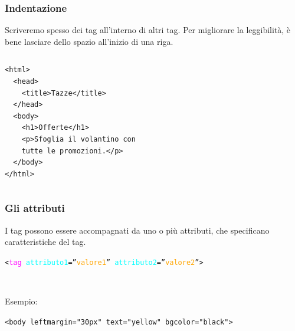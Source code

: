\documentclass[]{beamer}
\begin{document}
\begin{frame}[fragile]
\frametitle{Indentazione}
Scriveremo spesso dei tag all'interno di altri tag. Per migliorare la leggibilità, è bene lasciare dello spazio all'inizio di una riga.
\begin{columns}
\begin{column}{0.5\textwidth}
\begin{scriptsize}
\begin{verbatim}
<html>
  <head>
    <title>Tazze</title>
  </head>
  <body>
    <h1>Offerte</h1>
    <p>Sfoglia il volantino con
    tutte le promozioni.</p>
  </body>
</html>
\end{verbatim}
\end{scriptsize}\pause
\end{column}
\begin{column}{0.3\textwidth}
\begin{figure}
\end{figure}
\end{column}
\end{columns}  
\end{frame}

\begin{frame}[fragile]
\frametitle{Gli attributi}
I tag possono essere accompagnati da uno o più attributi, che specificano caratteristiche del tag.

\begin{center}
\texttt{<\textcolor{magenta}{tag} \textcolor{cyan}{attributo1}=''\textcolor{orange}{valore1}'' \textcolor{cyan}{attributo2}=''\textcolor{orange}{valore2}''>}
\end{center}\pause


~

Esempio:
\begin{center}
{\small \texttt{<body leftmargin="30px" text="yellow" bgcolor="black">}}
\end{center}
\end{frame}
\end{document}
